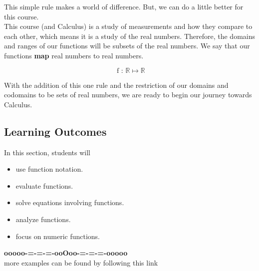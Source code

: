 \documentclass{ximera}
\begin{document}
This simple rule makes a world of difference. But, we can do a little better for this course. \\




This course (and Calculus) is a study of measurements and how they compare to each other, which means it is a study of the real numbers.  Therefore, the domains and ranges of our functions will be subsets of the real numbers.  We say that our functions \textbf{map} real numbers to real numbers.


\[
\text{ f : } \mathbb{R} \mapsto \mathbb{R}
\]





With the addition of this one rule and the restriction of our domains and codomains to be sets of real numbers, we are ready to begin our journey towards Calculus.








\subsection*{Learning Outcomes}


\begin{sectionOutcomes}
In this section, students will 

\begin{itemize}
\item use function notation.
\item evaluate functions.
\item solve equations involving functions.
\item analyze functions.
\item focus on numeric functions.
\end{itemize}
\end{sectionOutcomes}













\begin{onlineOnly}
\begin{center}
\textbf{\textcolor{green!50!black}{ooooo-=-=-=-ooOoo-=-=-=-ooooo}} \\

more examples can be found by following this link\\ 

\end{center}
\end{onlineOnly}
\end{document}
